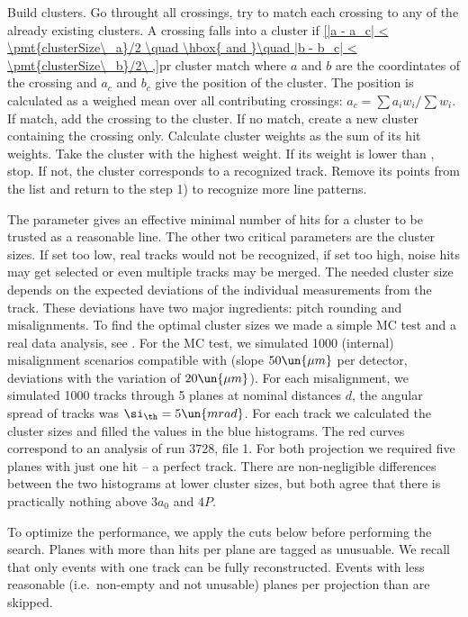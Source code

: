 \bitm
\itm Build clusters. Go throught all crossings, try to match each crossing to any of the already existing clusters. A crossing falls into a cluster if
\eqref{|a - a_c| < \pmt{clusterSize\_a}/2 \quad \hbox{ and }\quad |b - b_c| < \pmt{clusterSize\_b}/2\ ,}{pr cluster match}
where $a$ and $b$ are the coordintates of the crossing and $a_c$ and $b_c$ give the position of the cluster. The position is calculated as a weighed mean over all contributing crossings: $a_c = \sum a_i w_i / \sum w_i$.
If match, add the crossing to the cluster. If no match, create a new cluster containing the crossing only.
\itm Calculate cluster weights as the sum of its hit weights.
\itm Take the cluster with the highest weight. If its weight is lower than , stop. If not, the cluster corresponds to a recognized track. Remove its points from the list and return to the step 1) to recognize more line patterns.
\eitm

The  parameter gives an effective minimal number of hits for a cluster to be trusted as a reasonable line. The other two critical parameters are the cluster sizes. If set too low, real tracks would not be recognized, if set too high, noise hits may get selected or even multiple tracks may be merged. The needed cluster size depends on the expected deviations of the individual measurements from the track. These deviations have two major ingredients: pitch rounding and misalignments. To find the optimal cluster sizes we made a simple MC test and a real data analysis, see . For the MC test, we simulated  1000 (internal) misalignment scenarios compatible with  (slope $50\un{\mu m}$ per detector, deviations with the variation of $20\un{\mu m}$). For each misalignment, we simulated 1000 tracks through 5 planes at nominal distances $d$, the angular spread of tracks was $\si_\th = 5\un{mrad}$. For each track we calculated the cluster sizes and filled the values in the blue histograms. The red curves correspond to an analysis of run 3728, file 1. For both projection we required five planes with just one hit -- a perfect track. There are non-negligible differences between the two histograms at lower cluster sizes, but both agree that there is practically nothing above $3a_0$ and $4P$.


To optimize the performance, we apply the cuts below before performing the search.
\bitm
\itm Planes with more than  hits per plane are tagged as unusuable. We recall that only events with one track can be fully reconstructed.
\itm Events with less reasonable (i.e.~non-empty and not unusable) planes per projection than\break {} are skipped.
\eitm

